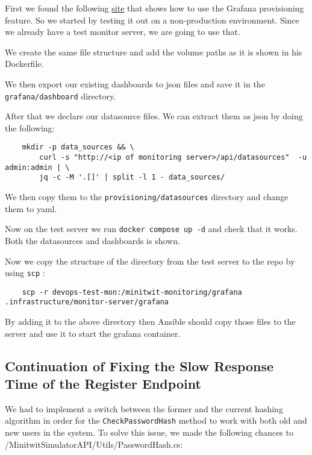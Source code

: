 First we found the following \href{https://github.com/SebastianTorralba/Self-Provisioned-Grafana}{site} that shows how to use the Grafana provisioning feature. So we started by testing it out on a non-production environment. Since we already have a test monitor server, we are going to use that.

We create the same file structure and add the volume paths as it is shown in his Dockerfile.

We then export our existing dashboards to json files and save it in the \texttt{grafana/dashboard} directory.

After that we declare our datasource files. We can extract them as json by doing the following:

\begin{verbatim}
    mkdir -p data_sources && \
        curl -s "http://<ip of monitoring server>/api/datasources"  -u admin:admin | \
        jq -c -M '.[]' | split -l 1 - data_sources/
\end{verbatim}

We then copy them to the \texttt{provisioning/datasources} directory and change them to yaml.

Now on the test server we run \texttt{docker\ compose\ up\ -d} and check that it works. Both the datasources and dashboards is shown.

Now we copy the structure of the directory from the test server to the repo by using \texttt{scp} :

\begin{verbatim}
    scp -r devops-test-mon:/minitwit-monitoring/grafana .infrastructure/monitor-server/grafana
\end{verbatim}

By adding it to the above directory then Ansible should copy those files to the server and use it to start the grafana container.

\subsection{Continuation of Fixing the Slow Response Time of the Register Endpoint}
\label{log:continuation-of-fixing-the-slow-response-time-of-the-register-endpoint}

We had to implement a switch between the former and the current hashing algorithm in order for the \texttt{CheckPasswordHash} method to work with both old and new users in the system. To solve this issue, we made the following chances to /MinitwitSimulatorAPI/Utils/PasswordHash.cs:

